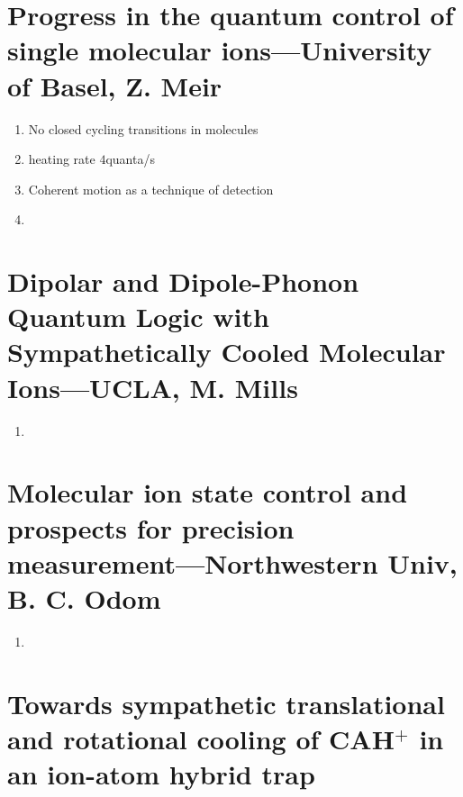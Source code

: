 \section{Progress in the quantum control of single molecular ions---University of Basel, Z. Meir} %
\label{sec:progress_in_the_quantum_control_of_single_molecular_ions_university_of_basel}

\begin{enumerate}
    \item No closed cycling transitions in molecules
    \item heating rate $4$quanta/s
    \item Coherent motion as a technique of detection
    \item
\end{enumerate}

\section{Dipolar and Dipole-Phonon Quantum Logic with Sympathetically Cooled Molecular Ions---UCLA, M. Mills} %
\label{sec:dipolar_and_dipole_phonon_quantum_logic_with_sympathetically_cooled_molecular_ions_ucla_m_mills}



\begin{enumerate}
    \item
\end{enumerate}

\section{Molecular ion state control and prospects for precision measurement---Northwestern Univ, B. C. Odom} %
\label{sec:molecular_ion_state_control_and_prospects_for_precision_measurement_northwestern_univ_b_c_odom}

\begin{enumerate}
    \item
\end{enumerate}



\section{Towards sympathetic translational and rotational cooling of CAH$^+$ in an ion-atom hybrid trap} %
\label{sec:towards_sympathetic_translational_and_rotational_cooling_of_cah}

